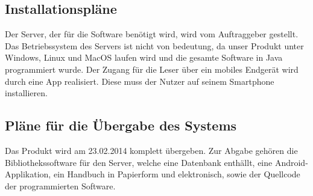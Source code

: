 \documentclass[fontsize=12pt,paper=a4,twoside]{scrartcl}
\begin{document}
\subsection{Installationspläne}

Der Server, der für die Software benötigt wird, wird vom Auftraggeber gestellt. Das Betriebssystem des Servers ist nicht von bedeutung, da unser Produkt unter Windows, Linux und MacOS laufen wird und die gesamte Software in Java programmiert wurde. Der Zugang für die Leser über ein mobiles Endgerät wird durch eine App realisiert. Diese muss der Nutzer auf seinem Smartphone installieren.

\subsection{Pläne für die Übergabe des Systems}

Das Produkt wird am 23.02.2014 komplett übergeben. Zur Abgabe gehören die Bibliothekssoftware für den Server, welche eine Datenbank enthällt, eine Android-Applikation, ein Handbuch in Papierform und elektronisch, sowie der Quellcode der programmierten Software.
\end{document}
